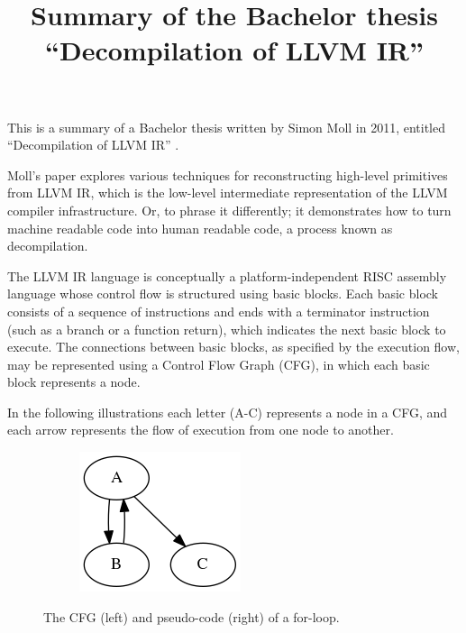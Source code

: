 \documentclass[12pt, a4paper]{article}
\title{Summary of the Bachelor thesis ``Decompilation of LLVM IR''}
\begin{document}
\maketitle

This is a summary of a Bachelor thesis written by Simon Moll in 2011, entitled ``Decompilation of LLVM IR'' \cite{decomp_llvm}.

Moll's paper explores various techniques for reconstructing high-level primitives from LLVM IR, which is the low-level intermediate representation of the LLVM compiler infrastructure. Or, to phrase it differently; it demonstrates how to turn machine readable code into human readable code, a process known as decompilation.

The LLVM IR language is conceptually a platform-independent RISC assembly language whose control flow is structured using basic blocks. Each basic block consists of a sequence of instructions and ends with a terminator instruction (such as a branch or a function return), which indicates the next basic block to execute. The connections between basic blocks, as specified by the execution flow, may be represented using a Control Flow Graph (CFG), in which each basic block represents a node.

In the following illustrations each letter (A-C) represents a node in a CFG, and each arrow represents the flow of execution from one node to another.

\begin{figure}[H]
   \centering
   \begin{subfigure}[b]{0.2\textwidth}
      \includegraphics[width=\textwidth]{inc/pre_loop.png}
   \end{subfigure}
   \qquad
   \begin{subfigure}[b]{0.2\textwidth}
      
   \end{subfigure}
   \caption{The CFG (left) and pseudo-code (right) of a for-loop.}
\end{figure}
\end{document}
